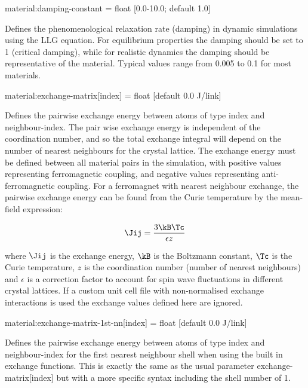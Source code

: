 {\zicf material:damping-constant = float [0.0-10.0; default 1.0]}
Defines the phenomenological relaxation rate (damping) in dynamic simulations
using the LLG equation. For equilibrium properties the damping should be set
to 1 (critical damping), while for realistic dynamics the damping should be
representative of the material. Typical values range from 0.005 to 0.1 for most
materials.

{\zicf material:exchange-matrix[index] = float [default 0.0 J/link]}
Defines the pairwise exchange energy between atoms of type index and
neighbour-index. The pair wise exchange energy is independent of the
coordination number, and so the total exchange integral will depend on the
number of nearest neighbours for the crystal lattice. The exchange energy must
be defined between all material pairs in the simulation, with positive values
representing ferromagnetic coupling, and negative values representing
anti-ferromagnetic coupling. For a ferromagnet with nearest neighbour exchange,
the pairwise exchange energy can be found from the Curie temperature by the
mean-field expression:

\begin{equation*}
\Jij = \frac{3\kB\Tc}{\epsilon z}
\end{equation*}

\noindent where $\Jij$ is the exchange energy, $\kB$ is the Boltzmann constant,
$\Tc$ is the Curie temperature, $z$ is the coordination number (number of
nearest neighbours) and $\epsilon$ is a correction factor to account for spin
wave fluctuations in different crystal lattices. If a custom unit cell file
with non-normalised exchange interactions is used the exchange values defined
here are ignored.

{\zicf material:exchange-matrix-1st-nn[index] = float [default 0.0 J/link]}
Defines the pairwise exchange energy between atoms of type index and
neighbour-index for the first nearest neighbour shell when using the built in
exchange functions. This is exactly the same as the usual parameter
exchange-matrix[index] but with a more specific syntax including the shell
number of 1.

